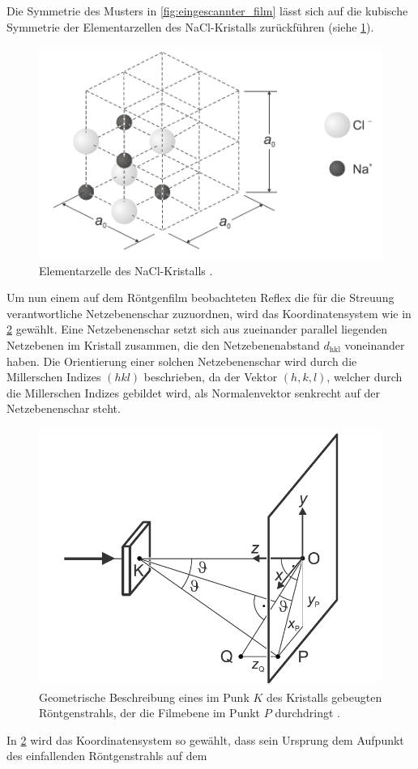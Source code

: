 Die Symmetrie des Musters in \cref{fig:eingescannter_film} lässt sich auf die kubische Symmetrie der Elementarzellen des NaCl-Kristalls zurückführen (siehe \cref{fig:elementarzelle_nacl}).
\begin{figure}[H]
	\centering
	\includegraphics[width=0.6\linewidth]{../figs/elementarzelle_nacl.png}
	\caption{Elementarzelle des NaCl-Kristalls \cite{laue_handblatt}.}
	\label{fig:elementarzelle_nacl}
\end{figure}
Um nun einem auf dem Röntgenfilm beobachteten Reflex die für die Streuung verantwortliche Netzebenenschar zuzuordnen, wird das Koordinatensystem wie in \cref{fig:skizze}
gewählt. Eine Netzebenenschar setzt sich aus zueinander parallel liegenden Netzebenen im Kristall zusammen, die den Netzebenenabstand $d_{\mathrm{hkl}}$ voneinander haben.
Die Orientierung einer solchen Netzebenenschar wird durch die Millerschen Indizes \cite{wiki:miller_indizes} $(hkl)$ beschrieben, da der Vektor $(h,k,l)$, welcher durch die
Millerschen Indizes gebildet wird, als Normalenvektor senkrecht auf der Netzebenenschar steht. 
\begin{figure}[H]
	\centering
	\includegraphics[width=0.6\linewidth]{../figs/skizze.png}
	\caption{Geometrische Beschreibung eines im Punk $K$ des Kristalls gebeugten Röntgenstrahls, der die Filmebene im Punkt $P$ durchdringt \cite{laue_handblatt}.}
	\label{fig:skizze}
\end{figure} In \cref{fig:skizze} wird das Koordinatensystem so gewählt, dass sein Ursprung dem Aufpunkt des einfallenden Röntgenstrahls auf dem
